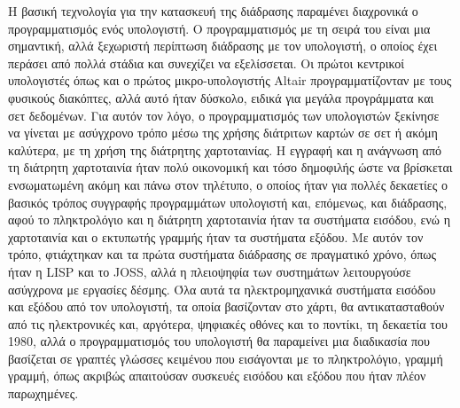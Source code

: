 \documentclass[
]{article}
\begin{document}
Η βασική τεχνολογία για την κατασκευή της διάδρασης παραμένει διαχρονικά
ο προγραμματισμός ενός υπολογιστή. Ο προγραμματισμός με τη σειρά του
είναι μια σημαντική, αλλά ξεχωριστή περίπτωση διάδρασης με τον
υπολογιστή, ο οποίος έχει περάσει από πολλά στάδια και συνεχίζει να
εξελίσσεται. Οι πρώτοι κεντρικοί υπολογιστές όπως και ο πρώτος
μικρο-υπολογιστής Altair προγραμματίζονταν με τους φυσικούς διακόπτες,
αλλά αυτό ήταν δύσκολο, ειδικά για μεγάλα προγράμματα και σετ δεδομένων.
Για αυτόν τον λόγο, ο προγραμματισμός των υπολογιστών ξεκίνησε να
γίνεται με ασύγχρονο τρόπο μέσω της χρήσης διάτριτων καρτών σε σετ ή
ακόμη καλύτερα, με τη χρήση της διάτρητης χαρτοταινίας. Η εγγραφή και η
ανάγνωση από τη διάτρητη χαρτοταινία ήταν πολύ οικονομική και τόσο
δημοφιλής ώστε να βρίσκεται ενσωματωμένη ακόμη και πάνω στον τηλέτυπο, ο
οποίος ήταν για πολλές δεκαετίες ο βασικός τρόπος συγγραφής προγραμμάτων
υπολογιστή και, επόμενως, και διάδρασης, αφού το πληκτρολόγιο και η
διάτρητη χαρτοταινία ήταν τα συστήματα εισόδου, ενώ η χαρτοταινία και ο
εκτυπωτής γραμμής ήταν τα συστήματα εξόδου. Με αυτόν τον τρόπο,
φτιάχτηκαν και τα πρώτα συστήματα διάδρασης σε πραγματικό χρόνο, όπως
ήταν η LISP και το JOSS, αλλά η πλειοψηφία των συστημάτων λειτουργούσε
ασύγχρονα με εργασίες δέσμης. Όλα αυτά τα ηλεκτρομηχανικά συστήματα
εισόδου και εξόδου από τον υπολογιστή, τα οποία βασίζονταν στο χάρτι, θα
αντικατασταθούν από τις ηλεκτρονικές και, αργότερα, ψηφιακές οθόνες και
το ποντίκι, τη δεκαετία του 1980, αλλά ο προγραμματισμός του υπολογιστή
θα παραμείνει μια διαδικασία που βασίζεται σε γραπτές γλώσσες κειμένου
που εισάγονται με το πληκτρολόγιο, γραμμή γραμμή, όπως ακριβώς
απαιτούσαν συσκευές εισόδου και εξόδου που ήταν πλέον παρωχημένες.
\end{document}
